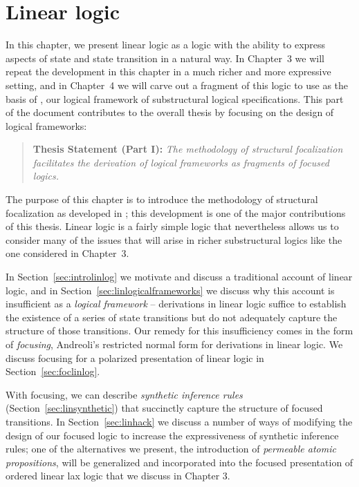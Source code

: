 \chapter{Linear logic}
\label{chapter-foc}

In this chapter, we present linear logic as a logic with the ability
to express aspects of state and state transition in a natural way.  In
Chapter~3 we will repeat the development in this chapter in a much
richer and more expressive setting, and in Chapter~4 we will carve out
a fragment of this logic to use as the basis of \sls, our logical
framework of substructural logical specifications. This part of the
document contributes to the overall thesis by focusing on the design
of logical frameworks:

\begin{quote} {\bf Thesis Statement (Part I):} {\it The methodology of
    structural focalization facilitates the derivation of logical
    frameworks as fragments of focused logics.}
\end{quote}

\noindent
The purpose of this chapter is to introduce the methodology of
structural focalization as developed in \cite{simmons11structural};
this development is one of the major contributions of this thesis.
Linear logic is a fairly simple logic that nevertheless allows us to
consider many of the issues that will arise in richer substructural
logics like the one considered in Chapter~3.

In Section~\ref{sec:introlinlog} we motivate and discuss a traditional
account of linear logic, and in
Section~\ref{sec:linlogicalframeworks} we discuss why this account is
insufficient as a {\it logical framework} -- derivations in linear
logic suffice to establish the existence of a series of state
transitions but do not adequately capture the structure of those
transitions. Our remedy for this insufficiency comes in the form of
{\it focusing}, Andreoli's restricted normal form for derivations in
linear logic. We discuss focusing for a polarized presentation of
linear logic in Section~\ref{sec:foclinlog}.

With focusing, we can describe {\it synthetic inference rules}
(Section~\ref{sec:linsynthetic}) that succinctly capture the structure
of focused transitions. In Section~\ref{sec:linhack} we discuss a
number of ways of modifying the design of our focused logic to
increase the expressiveness of synthetic inference rules; one of the
alternatives we present, the introduction of {\it permeable atomic
  propositions}, will be generalized and incorporated into the focused
presentation of ordered linear lax logic that we discuss in Chapter 3.

